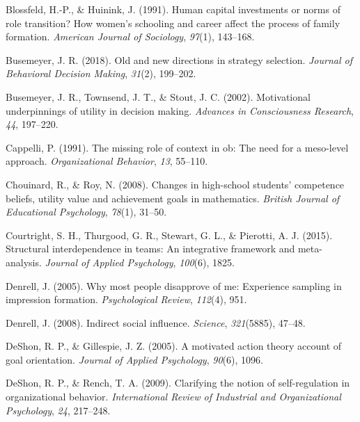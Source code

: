 \documentclass[english,,man]{apa6}
\theoremstyle{definition}
\theoremstyle{definition}
\theoremstyle{definition}
\theoremstyle{remark}
\begin{document}
\leavevmode\hypertarget{ref-blossfeld1991human}{}%
Blossfeld, H.-P., \& Huinink, J. (1991). Human capital investments or
norms of role transition? How women's schooling and career affect the
process of family formation. \emph{American Journal of Sociology},
\emph{97}(1), 143--168.

\leavevmode\hypertarget{ref-busemeyer2018}{}%
Busemeyer, J. R. (2018). Old and new directions in strategy selection.
\emph{Journal of Behavioral Decision Making}, \emph{31}(2), 199--202.

\leavevmode\hypertarget{ref-busemeyer2002}{}%
Busemeyer, J. R., Townsend, J. T., \& Stout, J. C. (2002). Motivational
underpinnings of utility in decision making. \emph{Advances in
Consciousness Research}, \emph{44}, 197--220.

\leavevmode\hypertarget{ref-cappelli1991missing}{}%
Cappelli, P. (1991). The missing role of context in ob: The need for a
meso-level approach. \emph{Organizational Behavior}, \emph{13}, 55--110.

\leavevmode\hypertarget{ref-chouinard2008changes}{}%
Chouinard, R., \& Roy, N. (2008). Changes in high-school students'
competence beliefs, utility value and achievement goals in mathematics.
\emph{British Journal of Educational Psychology}, \emph{78}(1), 31--50.

\leavevmode\hypertarget{ref-courtright2015structural}{}%
Courtright, S. H., Thurgood, G. R., Stewart, G. L., \& Pierotti, A. J.
(2015). Structural interdependence in teams: An integrative framework
and meta-analysis. \emph{Journal of Applied Psychology}, \emph{100}(6),
1825.

\leavevmode\hypertarget{ref-denrell2005}{}%
Denrell, J. (2005). Why most people disapprove of me: Experience
sampling in impression formation. \emph{Psychological Review},
\emph{112}(4), 951.

\leavevmode\hypertarget{ref-denrell2008indirect}{}%
Denrell, J. (2008). Indirect social influence. \emph{Science},
\emph{321}(5885), 47--48.

\leavevmode\hypertarget{ref-deshon2005motivated}{}%
DeShon, R. P., \& Gillespie, J. Z. (2005). A motivated action theory
account of goal orientation. \emph{Journal of Applied Psychology},
\emph{90}(6), 1096.

\leavevmode\hypertarget{ref-deshon2009clarifying}{}%
DeShon, R. P., \& Rench, T. A. (2009). Clarifying the notion of
self-regulation in organizational behavior. \emph{International Review
of Industrial and Organizational Psychology}, \emph{24}, 217--248.
\end{document}
